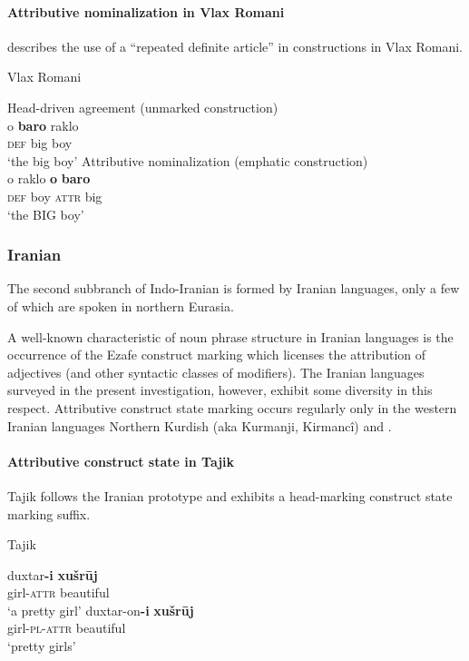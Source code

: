 \paragraph*{Attributive nominalization in Vlax Romani}
\citet{hancock1995} describes the use of a “repeated definite article” in  constructions in Vlax Romani. 
\begin{exe}
\ex \rm{Vlax Romani \citep[30]{hancock1995}}
\begin{xlist}
\ex \rm{Head\hyp{}driven agreement (unmarked construction)}\\
\gll	o \textbf{baro} raklo\\
	\textsc{def}	big	boy\\
\glt ‘the big boy’
\ex \rm{Attributive nominalization (emphatic construction)}\\
\gll	o raklo \textbf{o} \textbf{baro}\\
	\textsc{def}	{boy}	\textsc{attr} big\\
\glt	‘the BIG boy’
\end{xlist}
\end{exe}

\subsubsection{Iranian}\label{iranian synchr}
The second subbranch of Indo-Iranian is formed by Iranian languages, only a few of which are spoken in northern Eurasia.

A well-known characteristic of noun phrase structure in Iranian languages is the occurrence of the Ezafe construct marking which licenses the attribution of adjectives (and other syntactic classes of modifiers). The Iranian languages surveyed in the present investigation, however, exhibit some diversity in this respect. Attributive construct state marking occurs regularly only in the western Iranian languages Northern Kurdish (aka Kurmanji, Kirmancî) and .

\paragraph*{Attributive construct state in Tajik}
Tajik follows the Iranian prototype and exhibits a head-marking construct state marking suffix.
\begin{exe}
\ex \rm{Tajik \citep{rastorgueva1963}}
\begin{xlist}
\ex
\gll	duxtar\textbf{-i} \textbf{xušrūj}\\
	girl-\textsc{attr} beautiful\\
\glt	‘a pretty girl’
\ex
\gll	duxtar-on\textbf{-i} \textbf{xušrūj}\\
	girl-\textsc{pl}-\textsc{attr} beautiful\\
\glt	‘pretty girls’
\end{xlist}
\end{exe}

